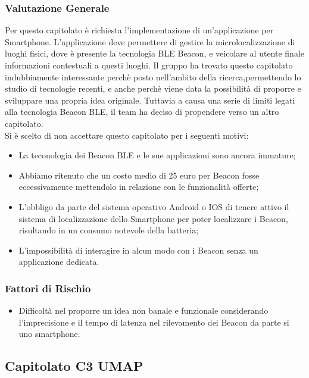 \documentclass[12pt,a4paper]{article}
\begin{document}
\subsubsection{Valutazione Generale}

Per questo capitolato è richiesta l'implementazione di un'applicazione per Smartphone. L'applicazione deve permettere di gestire la microlocalizzazione di luoghi fisici, dove è presente la tecnologia BLE Beacon, e veicolare al utente finale informazioni contestuali a questi luoghi. 
Il gruppo ha trovato questo capitolato indubbiamente interessante perchè  posto nell'ambito della ricerca,permettendo lo studio di tecnologie recenti, e anche perchè viene data la possibilità di proporre e sviluppare una propria idea originale. Tuttavia a causa una serie di limiti legati alla tecnologia Beacon BLE, il team ha deciso di propendere verso un altro capitolato.\\

Si è scelto di non accettare questo capitolato per i seguenti motivi:
\begin{itemize}
\item La teconologia dei Beacon BLE e le sue applicazioni sono ancora immature;
\item Abbiamo ritenuto che un costo medio di 25 euro per Beacon fosse eccessivamente mettendolo in relazione con le funzionalità offerte;
\item L'obbligo da parte del sistema operativo Android o IOS di tenere attivo il sistema di localizzazione dello Smartphone per poter localizzare i Beacon, risultando in un consumo notevole della batteria;
\item L'impossibilità di interagire in alcun modo con i Beacon senza un applicazione dedicata.
\end{itemize}

\subsubsection{Fattori di Rischio}

\begin{itemize}
\item Difficoltà nel proporre un idea non banale e funzionale considerando l'imprecisione e il tempo di latenza nel rilevamento dei Beacon da parte si uno smartphone.
\end{itemize}

\newpage
\subsection{Capitolato C3 UMAP}
\end{document}
